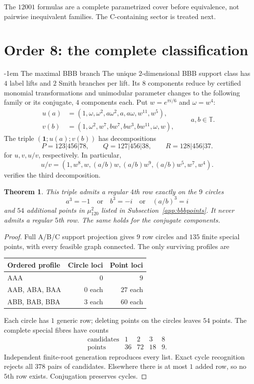 \documentclass[11pt,a4paper]{article}
\makeatletter
\newtheorem{theorem}{Theorem}[section]
\theoremstyle{plain}
\theoremstyle{definition}
\numberwithin{equation}{section}
\renewcommand\subsection{\@startsection{subsection}{2}{\z@}  {\medskipamount}  {-1em}  {\normalfont\normalsize\bfseries}}
\makeatother
\begin{document}
The $12001$ formulas are a complete parametrized cover before equivalence, not pairwise inequivalent families. The C-containing sector is treated next.

\section{Order 8: the complete classification}\label{sec:N8part3}
\subsection{The maximal BBB branch}\label{sec:bbb}
The unique $2$-dimensional BBB support class has $4$ label lifts and $2$ Smith branches per lift. Its $8$ components reduce by certified monomial transformations and unimodular parameter changes to the following family or its conjugate, $4$ components each. Put $w=e^{\pi i/6}$ and $\omega=w^4$:
\begin{equation}\label{eq:BBB}
\begin{aligned}
u(a)&=(1,\omega,\omega^2,a\omega^2,a,a\omega,w^{11},w^5),\\
v(b)&=(1,\omega^2,w^7,bw^7,bw^3,bw^{11},\omega,w),
\end{aligned}
\qquad a,b\in\mathbb{T}.
\end{equation}
The triple $(\mathbf1;u(a);v(b))$ has decompositions
$$P=123|456|78,\qquad Q=127|456|38,\qquad R=128|456|37.$$
for $u,v,u/v$, respectively. In particular,
$$
u/v=(1,w^8,w,(a/b)w,(a/b)w^9,
       (a/b)w^5,w^7,w^4).
$$
verifies the third decomposition.
\begin{theorem}\label{thm:BBB}
This triple admits a regular $4$th row exactly on the $9$ circles
$$\boxed{a^3=-1\quad\text{or}\quad b^3=-i\quad\text{or}\quad(a/b)^3=i}$$
and $54$ additional points in $\mu_{120}^2$ listed in Subsection~\ref{app:bbbpoints}. It never admits a regular $5$th row. The same holds for the conjugate components.
\end{theorem}
\begin{proof}
Full A/B/C support projection gives $9$ row circles and $135$ finite special points, with every feasible graph connected. The only surviving profiles are
\begin{center}\begin{tabular}{lrr}\toprule
Ordered profile&Circle loci&Point loci\\\midrule
AAA&$0$&$9$\\
AAB, ABA, BAA&$0$ each&$27$ each\\
ABB, BAB, BBA&$3$ each&$60$ each\\\bottomrule
\end{tabular}\end{center}
Each circle has $1$ generic row; deleting points on the circles leaves $54$ points. The complete special fibres have counts
$$
\begin{array}{c|rrrr}
\text{candidates}&1&2&3&8\\\hline
\text{points}&36&72&18&9.
\end{array}
$$
Independent finite-root generation reproduces every list. Exact cycle recognition rejects all $378$ pairs of candidates. Elsewhere there is at most $1$ added row, so no $5$th row exists. Conjugation preserves cycles.
\end{proof}
\end{document}
